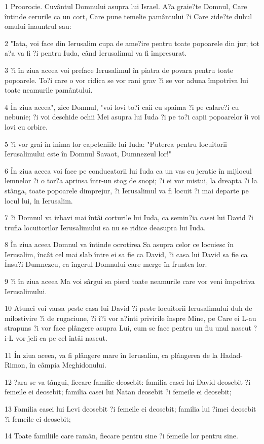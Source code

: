 \par 1 Proorocie. Cuvântul Domnului asupra lui Israel. A?a graie?te Domnul, Care întinde cerurile ca un cort, Care pune temelie pamântului ?i Care zide?te duhul omului înauntrul sau:
\par 2 "Iata, voi face din Ierusalim cupa de ame?ire pentru toate popoarele din jur; tot a?a va fi ?i pentru Iuda, când Ierusalimul va fi împresurat.
\par 3 ?i în ziua aceea voi preface Ierusalimul în piatra de povara pentru toate popoarele. To?i care o vor ridica se vor rani grav ?i se vor aduna împotriva lui toate neamurile pamântului.
\par 4 În ziua aceea", zice Domnul, "voi lovi to?i caii cu spaima ?i pe calare?i cu nebunie; ?i voi deschide ochii Mei asupra lui Iuda ?i pe to?i capii popoarelor îi voi lovi cu orbire.
\par 5 ?i vor grai în inima lor capeteniile lui Iuda: "Puterea pentru locuitorii Ierusalimului este în Domnul Savaot, Dumnezeul lor!"
\par 6 În ziua aceea voi face pe conducatorii lui Iuda ca un vas cu jeratic în mijlocul lemnelor ?i o tor?a aprinsa într-un stog de snopi; ?i ei vor mistui, la dreapta ?i la stânga, toate popoarele dimprejur, ?i Ierusalimul va fi locuit ?i mai departe pe locul lui, în Ierusalim.
\par 7 ?i Domnul va izbavi mai întâi corturile lui Iuda, ca semin?ia casei lui David ?i trufia locuitorilor Ierusalimului sa nu se ridice deasupra lui Iuda.
\par 8 În ziua aceea Domnul va întinde ocrotirea Sa asupra celor ce locuiesc în Ierusalim, încât cel mai slab între ei sa fie ca David, ?i casa lui David sa fie ca Însu?i Dumnezeu, ca îngerul Domnului care merge în fruntea lor.
\par 9 ?i în ziua aceea Ma voi sârgui sa pierd toate neamurile care vor veni împotriva Ierusalimului.
\par 10 Atunci voi varsa peste casa lui David ?i peste locuitorii Ierusalimului duh de milostivire ?i de rugaciune, ?i î?i vor a?inti privirile înspre Mine, pe Care ei L-au strapuns ?i vor face plângere asupra Lui, cum se face pentru un fiu unul nascut ?i-L vor jeli ca pe cel întâi nascut.
\par 11 În ziua aceea, va fi plângere mare în Ierusalim, ca plângerea de la Hadad-Rimon, în câmpia Meghidonului.
\par 12 ?ara se va tângui, fiecare familie deosebit: familia casei lui David deosebit ?i femeile ei deosebit; familia casei lui Natan deosebit ?i femeile ei deosebit;
\par 13 Familia casei lui Levi deosebit ?i femeile ei deosebit; familia lui ?imei deosebit ?i femeile ei deosebit;
\par 14 Toate familiile care ramân, fiecare pentru sine ?i femeile lor pentru sine.

